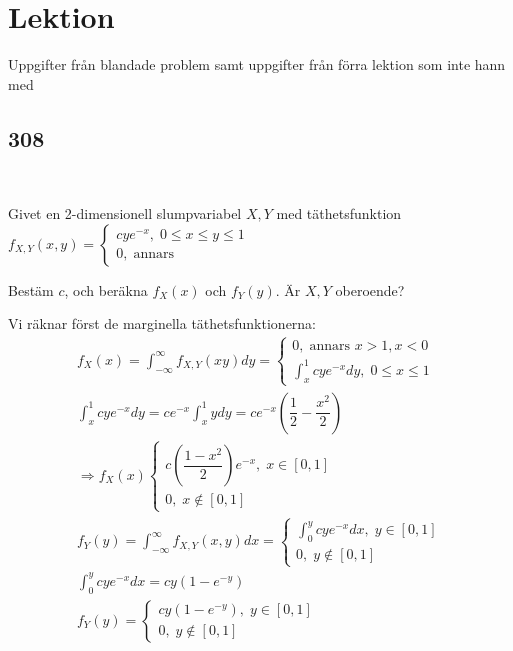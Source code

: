 \section{Lektion}\par
\noindent Uppgifter från blandade problem samt uppgifter från förra lektion som inte hann med
\par\bigskip
\subsection{308}\hfill\\\par
\noindent Givet en 2-dimensionell slumpvariabel $X,Y$ med täthetsfunktion $f_{X,Y} (x,y) = \begin{cases}cye^{-x},\;0\leq x\leq y\leq1\\0,\;\text{annars}\end{cases}$
\par\bigskip
\noindent Bestäm $c$, och beräkna $f_X(x)$ och $f_Y(y)$. Är $X,Y$ oberoende?
\par\bigskip
\noindent Vi räknar först de marginella täthetsfunktionerna:
\begin{equation*}
  \begin{gathered}
    f_X(x) = \int_{-\infty}^{\infty}f_{X,Y}(xy)dy = \begin{cases}0,\;\text{annars } x>1, x<0\\\int_{x}^{1}cye^{-x}dy,\; 0\leq x\leq1\end{cases}\\
    \int_{x}^{1}cye^{-x}dy = ce^{-x}\int_{x}^{1}ydy = ce^{-x}\left(\dfrac{1}{2}-\dfrac{x^2}{2}\right)\\
    \Rightarrow f_X(x)\begin{cases}c\left(\dfrac{1-x^2}{2}\right)e^{-x},\;x\in[0,1]\\0,\; x\notin[0,1]\end{cases}\\
      f_Y(y) = \int_{-\infty}^{\infty}f_{X,Y}(x,y)dx = \begin{cases}\int_{0}^{y}cye^{-x}dx,\; y\in[0,1]\\0,\; y\notin[0,1]\end{cases}\\
      \int_{0}^{y}cye^{-x}dx = cy(1-e^{-y})\\
      f_Y(y) = \begin{cases}cy(1-e^{-y}),\;y\in[0,1]\\0,\; y\notin[0,1]\end{cases}
  \end{gathered}
\end{equation*}
